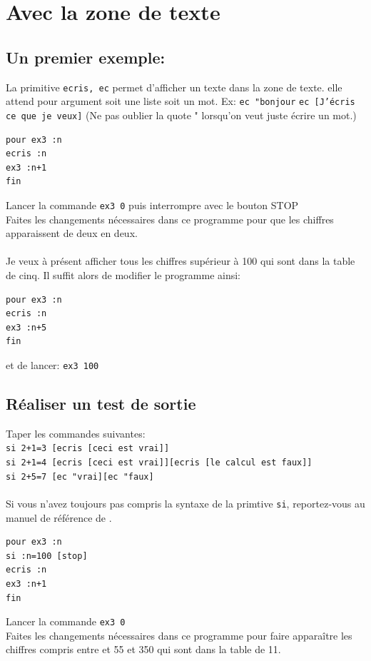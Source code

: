 \section{Avec la zone de texte}
\subsection{Un premier exemple:}
\noindent La primitive \texttt{ecris, ec} permet d'afficher un texte dans la zone de texte. elle attend pour argument soit une liste soit un mot. Ex: \texttt{ec "bonjour} \texttt{ec [J'écris ce que je veux]} (Ne pas oublier la quote " lorsqu'on veut juste écrire un mot.)
\begin{verbatim}
pour ex3 :n
ecris :n
ex3 :n+1
fin
\end{verbatim}
Lancer la commande \texttt{ex3 0} puis interrompre avec le bouton STOP\\
Faites les changements nécessaires dans ce programme pour que les chiffres apparaissent de deux en deux.\\
\\
Je veux à présent afficher tous les chiffres supérieur à 100 qui sont dans la table de cinq. Il suffit alors de modifier le programme ainsi:
\begin{verbatim}
pour ex3 :n
ecris :n
ex3 :n+5
fin
\end{verbatim}
 et de lancer: \texttt{ex3 100}
\subsection{Réaliser un test de sortie}
\noindent Taper les commandes suivantes:\\
\texttt{si 2+1=3 [ecris [ceci est vrai]]} \\
\texttt{si 2+1=4 [ecris [ceci est vrai]][ecris [le calcul est faux]]} \\
\texttt{si 2+5=7 [ec "vrai][ec "faux]}\\
\\
Si vous n'avez toujours pas compris la syntaxe de la primtive \texttt{si}, reportez-vous au manuel de référence de \xlogo.
\begin{verbatim}
pour ex3 :n
si :n=100 [stop]
ecris :n
ex3 :n+1
fin
\end{verbatim}
Lancer la commande \texttt{ex3 0}\\
Faites les changements nécessaires dans ce programme pour faire apparaître les chiffres compris entre et 55 et 350 qui sont dans la table de 11.\\
